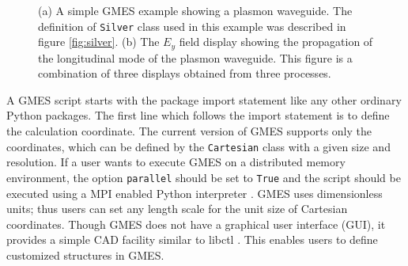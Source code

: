 \begin{figure}[hp!]
  \begin{center}
  \end{center}
  \caption{(a) A simple GMES example showing a plasmon waveguide. The definition of \texttt{Silver} class used in this example was described in figure \ref{fig:silver}. (b) The $E_y$ field display showing the propagation of the longitudinal mode of the plasmon waveguide. This figure is a combination of three displays obtained from three processes.}
  \label{fig:metal_array}
\end{figure}

A GMES script starts with the package import statement like any other ordinary Python packages. The first line which follows the import statement is to define the calculation coordinate. The current version of GMES supports only the  coordinates, which can be defined by the \texttt{Cartesian} class with a given size and resolution. If a user wants to execute GMES on a distributed memory environment, the option \texttt{parallel} should be set to \texttt{True} and the script should be executed using a MPI enabled Python interpreter \cite{dalcin_mpi_2012}. GMES uses dimensionless units; thus users can set any length scale for the unit size of Cartesian coordinates. Though GMES does not have a graphical user interface (GUI), it provides a simple CAD facility similar to libctl \cite{johnson_libctl_2012}. This enables users to define customized structures in GMES. 

